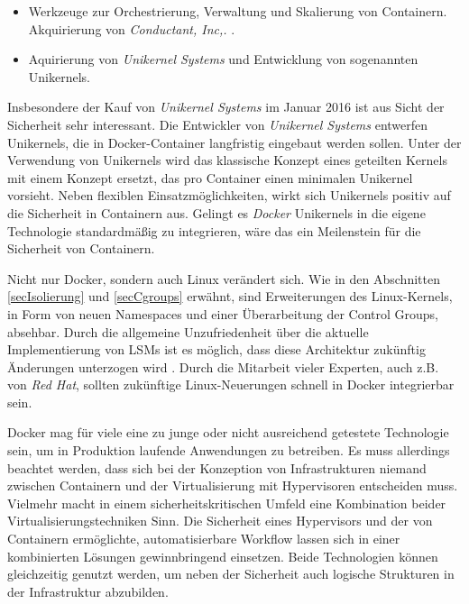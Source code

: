 \documentclass[../main.tex]{subfiles}
\begin{document}
\begin{itemize}
    \item Werkzeuge zur Orchestrierung, Verwaltung und Skalierung von Containern. Akquirierung von \emph{Conductant, Inc,.} \cite{dockerAurora}.%
    \item Aquirierung von \emph{Unikernel Systems} und Entwicklung von sogenannten Unikernels. \cite{dockerUnikernel}
  \end{itemize}

  Insbesondere der Kauf von \emph{Unikernel Systems} im Januar 2016 ist aus Sicht der Sicherheit sehr interessant. Die Entwickler von \emph{Unikernel Systems} entwerfen Unikernels, die in Docker-Container langfristig eingebaut werden sollen. Unter der Verwendung von Unikernels wird das klassische Konzept eines geteilten Kernels mit einem Konzept ersetzt, das pro Container einen minimalen Unikernel vorsieht. Neben flexiblen Einsatzmöglichkeiten, wirkt sich Unikernels positiv auf die Sicherheit in Containern aus. Gelingt es \emph{Docker} Unikernels in die eigene Technologie standardmäßig zu integrieren, wäre das ein Meilenstein für die Sicherheit von Containern.

  Nicht nur Docker, sondern auch Linux verändert sich. Wie in den Abschnitten \ref{secIsolierung} und \ref{secCgroups} erwähnt, sind Erweiterungen des Linux-Kernels, in Form von neuen Namespaces und einer Überarbeitung der Control Groups, absehbar. Durch die allgemeine Unzufriedenheit über die aktuelle Implementierung von LSMs ist es möglich, dass diese Architektur zukünftig Änderungen unterzogen wird \cite{seccompLWN}. Durch die Mitarbeit vieler Experten, auch z.B. von \emph{Red Hat}, sollten zukünftige Linux-Neuerungen schnell in Docker integrierbar sein.

  Docker mag für viele eine zu junge oder nicht ausreichend getestete Technologie sein, um in Produktion laufende Anwendungen zu betreiben. Es muss allerdings beachtet werden, dass sich bei der Konzeption von Infrastrukturen niemand zwischen Containern und der Virtualisierung mit Hypervisoren entscheiden muss. Vielmehr macht in einem sicherheitskritischen Umfeld eine Kombination beider Virtualisierungstechniken Sinn. Die Sicherheit eines Hypervisors und der von Containern ermöglichte, automatisierbare Workflow lassen sich in einer kombinierten Lösungen gewinnbringend einsetzen. Beide Technologien können gleichzeitig genutzt werden, um neben der Sicherheit auch logische Strukturen in der Infrastruktur abzubilden.
\end{document}

